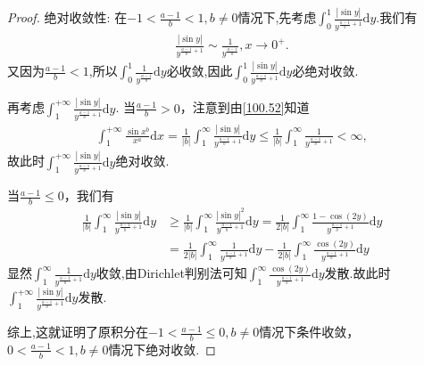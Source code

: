 \documentclass[../../main.tex]{subfiles}
\begin{document}
\begin{proof}
{\heiti 绝对收敛性:} 在\(-1 < \frac{a - 1}{b} < 1, b\neq 0\)情况下,先考虑$\int_0^1{\frac{\left| \sin y \right|}{y^{\frac{a-1}{b}+1}}\mathrm{d}y}$.我们有
\begin{align*}
\frac{\left| \sin y \right|}{y^{\frac{a-1}{b}+1}}\sim \frac{1}{y^{\frac{a-1}{b}}},x\rightarrow 0^+.
\end{align*}
又因为$\frac{a-1}{b}<1$,所以$\int_0^1{\frac{1}{y^{\frac{a-1}{b}}}\mathrm{d}y}$必收敛,因此$\int_0^1{\frac{\left| \sin y \right|}{y^{\frac{a-1}{b}+1}}\mathrm{d}y}$必绝对收敛.

再考虑$\int_{1}^{+\infty}{\frac{\left| \sin y \right|}{y^{\frac{a-1}{b}+1}}\mathrm{d}y}$.
当\(\frac{a - 1}{b}>0\)，注意到由\eqref{100.52}知道
\begin{align*}
\int_{1}^{+\infty}\frac{\sin x^b}{x^a}\mathrm{d}x=\frac{1}{|b|}\int_{1}^{\infty}\frac{|\sin y|}{y^{\frac{a - 1}{b}+1}}\mathrm{d}y \leqslant \frac{1}{|b|}\int_{1}^{\infty}\frac{1}{y^{\frac{a - 1}{b}+1}} < \infty,
\end{align*}
故此时$\int_{1}^{+\infty}{\frac{\left| \sin y \right|}{y^{\frac{a-1}{b}+1}}\mathrm{d}y}$绝对收敛.

当\(\frac{a - 1}{b}\leqslant 0\)，我们有
\begin{align*}
\frac{1}{|b|}\int_{1}^{\infty}\frac{|\sin y|}{y^{\frac{a - 1}{b}+1}}\mathrm{d}y &\geqslant \frac{1}{|b|}\int_{1}^{\infty}\frac{|\sin y|^2}{y^{\frac{a - 1}{b}+1}}\mathrm{d}y = \frac{1}{2|b|}\int_{1}^{\infty}\frac{1 - \cos(2y)}{y^{\frac{a - 1}{b}+1}}\mathrm{d}y \\
&= \frac{1}{2|b|}\int_{1}^{\infty}\frac{1}{y^{\frac{a - 1}{b}+1}}\mathrm{d}y - \frac{1}{2|b|}\int_{1}^{\infty}\frac{\cos(2y)}{y^{\frac{a - 1}{b}+1}}\mathrm{d}y
\end{align*}
显然$\int_{1}^{\infty}\frac{1}{y^{\frac{a - 1}{b}+1}}\mathrm{d}y$收敛,由Dirichlet判别法可知$\int_{1}^{\infty}\frac{\cos(2y)}{y^{\frac{a - 1}{b}+1}}\mathrm{d}y$发散.故此时$\int_{1}^{+\infty}{\frac{\left| \sin y \right|}{y^{\frac{a-1}{b}+1}}\mathrm{d}y}$发散.

综上,这就证明了原积分在\(-1 < \frac{a - 1}{b} \leqslant 0, b\neq 0\)情况下条件收敛，\(0 < \frac{a - 1}{b} < 1, b\neq 0\)情况下绝对收敛. 

\end{proof}
\end{document}
